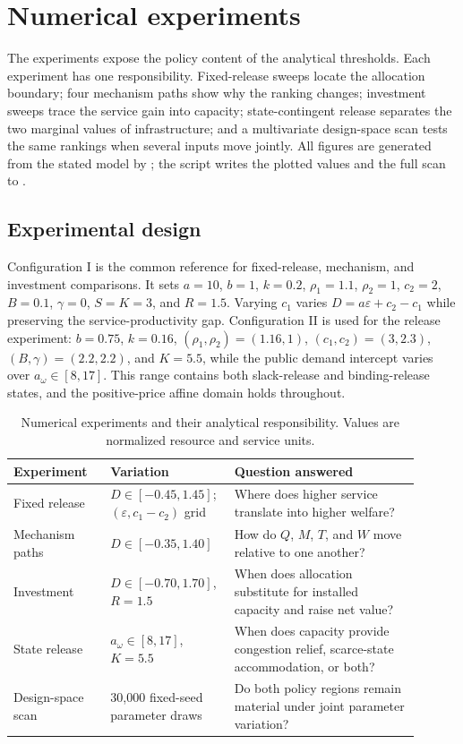 \section{Numerical experiments}\label{sec:numerical}

The experiments expose the policy content of the analytical thresholds. Each experiment has one responsibility. Fixed-release sweeps locate the allocation boundary; four mechanism paths show why the ranking changes; investment sweeps trace the service gain into capacity; state-contingent release separates the two marginal values of infrastructure; and a multivariate design-space scan tests the same rankings when several inputs move jointly. All figures are generated from the stated model by ; the script writes the plotted values and the full scan to .

\subsection{Experimental design}\label{subsec:numerical-design}

Configuration I is the common reference for fixed-release, mechanism, and investment comparisons. It sets $a=10$, $b=1$, $k=0.2$, $\rho_1=1.1$, $\rho_2=1$, $c_2=2$, $B=0.1$, $\gamma=0$, $S=K=3$, and $R=1.5$. Varying $c_1$ varies
$D=a\varepsilon+c_2-c_1$ while preserving the service-productivity gap. Configuration II is used for the release experiment: $b=0.75$, $k=0.16$, $(\rho_1,\rho_2)=(1.16,1)$, $(c_1,c_2)=(3,2.3)$, $(B,\gamma)=(2.2,2.2)$, and $K=5.5$, while the public demand intercept varies over $a_\omega\in[8,17]$. This range contains both slack-release and binding-release states, and the positive-price affine domain holds throughout.

\begin{table}[htbp]
\centering\small
\caption{Numerical experiments and their analytical responsibility. Values are normalized resource and service units.}\label{tab:numerical-design}
\setlength{\tabcolsep}{4pt}
\begin{tabular}{P{0.22\linewidth}P{0.26\linewidth}P{0.42\linewidth}}
\toprule
Experiment & Variation & Question answered \\
\midrule
Fixed release & $D\in[-0.45,1.45]$; $(\varepsilon,c_1-c_2)$ grid & Where does higher service translate into higher welfare? \\
Mechanism paths & $D\in[-0.35,1.40]$ & How do $Q$, $M$, $T$, and $W$ move relative to one another? \\
Investment & $D\in[-0.70,1.70]$, $R=1.5$ & When does allocation substitute for installed capacity and raise net value? \\
State release & $a_\omega\in[8,17]$, $K=5.5$ & When does capacity provide congestion relief, scarce-state accommodation, or both? \\
Design-space scan & 30,000 fixed-seed parameter draws & Do both policy regions remain material under joint parameter variation? \\
\bottomrule
\end{tabular}
\end{table}

